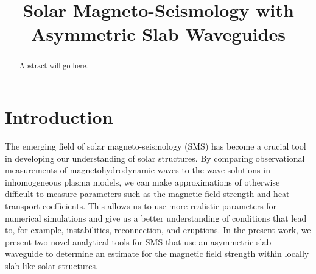 \documentclass[namedreferences]{solarphysics}
\numberwithin{equation}{section}
\begin{document}
\begin{article}

\begin{opening}

\title{Solar Magneto-Seismology with Asymmetric Slab Waveguides}

\author[addressref={UoS},email={}]{}

\author[addressref={UoS},corref,email={robertus@sheffield.ac.uk}]{}

%

\address[id={UoS}]{Solar Physics and Space Plasma Research Centre, School of Mathematics and Statistics, University of Sheffield, Hicks Building, Hounsfield Road, Sheffield, S3 7RH, UK.}


\begin{abstract}
Abstract will go here.
\end{abstract}
\end{opening}

\section{Introduction}
The emerging field of solar magneto-seismology (SMS) has become a crucial tool in developing our understanding of solar structures. By comparing observational measurements of magnetohydrodynamic waves to the wave solutions in inhomogeneous plasma models, we can make approximations of otherwise difficult-to-measure parameters such as the magnetic field strength and heat transport coefficients. This allows us to use more realistic parameters for numerical simulations and give us a better understanding of conditions that lead to, for example, instabilities, reconnection, and eruptions. In the present work, we present two novel analytical tools for SMS that use an asymmetric slab waveguide to determine an estimate for the magnetic field strength within locally slab-like solar structures.


\end{article}
\end{document}
